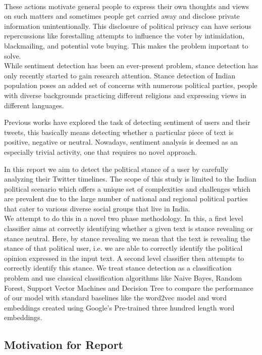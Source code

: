 \documentclass[a4paper,11pt]{article}
\begin{document}
\medskip\\
These actions motivate general people to express their own thoughts and views on such matters and sometimes people get carried away and disclose private information unintentionally. This disclosure of political privacy can have serious repercussions like forestalling attempts to influence the voter by intimidation, blackmailing, and potential vote buying. This makes the problem important to solve.
\medskip\\
While sentiment detection has been an ever-present problem, stance detection has only recently started to gain research attention. Stance detection of Indian population poses an added set of concerns with numerous political parties, people with diverse backgrounds practicing different religions and expressing views in different languages.

Previous works have explored the task of detecting sentiment of users and their tweets, this basically means detecting whether a particular piece of text is positive, negative or neutral. Nowadays, sentiment analysis is deemed as an especially trivial activity, one that requires no novel approach.

In this report we aim to detect the political stance of a user by carefully analyzing their Twitter timelines. The scope of this study is limited to the Indian political scenario which offers a unique set of complexities and challenges which are prevalent due to the large number of national and regional political parties that cater to various diverse social groups that live in India.
\medskip\\
We attempt to do this in a novel two phase methodology. In this, a first level classifier aims at correctly identifying whether a given text is stance revealing or stance neutral. Here, by stance revealing we mean that the text is revealing the stance of that political user, i.e. we are able to correctly identify the political opinion expressed in the input text.
A second level classifier then attempts to correctly identify this stance.
We treat stance detection as a classification problem and use classical classification algorithms like Naive Bayes, Random Forest, Support Vector Machines and Decision Tree to compare the performance of our model with standard baselines like the word2vec model and word embeddings created using Google's Pre-trained three hundred length word embeddings.

\newpage
\subsection{Motivation for Report}
\end{document}
